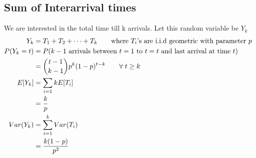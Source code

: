 \documentclass[../../probability-notes.tex]{subfiles}
\begin{document}
    \subsection{Sum of Interarrival times}
    We are interested in the total time till k arrivals. Let this random variable be $Y_{k}$
    \begin{align*}
        Y_{k} &= T_{1} + T_{2} + \cdots + T_{k} \tag*{where $T_{i}$'s are i.i.d geometric with parameter $p$}\\
        P(Y_{k} = t) &= P(\text{$k-1$ arrivals between $t=1$ to $t=t$ and last arrival at time $t$})\\
           &= \binom{t-1}{k-1}p^{k}(1-p)^{t-k} \tag*{$\forall\; t \geq k$}\\
        E[Y_{k}] &= \sum_{i=1}{k}E[T_{i}]\\
                &= \frac{k}{p}\\
        Var(Y_{k}) &= \sum_{i=1}^{k}Var(T_{i})\\
                    &= \frac{k(1-p)}{p^{2}}
    \end{align*}
\end{document}
